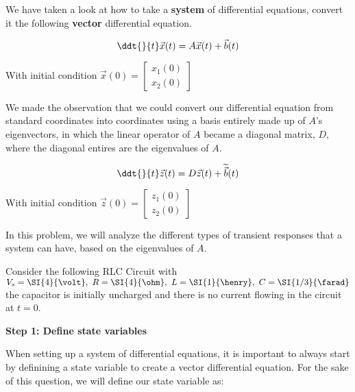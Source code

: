 

We have taken a look at how to take a \textbf{system} of differential equations, convert it the following \textbf{vector} differential equation.

\begin{equation}\label{eq:vec}
\ddt{}{t} \vec{x}(t) = A \vec{x}(t) + \vec{b}(t)
\end{equation}

With initial condition $\vec{x}(0) = \begin{bmatrix} x_1(0) \\ x_2(0) \end{bmatrix}$

We made the observation that we could convert our differential equation from standard coordinates into coordinates using a basis entirely made up of $A$'s eigenvectors, in which the linear operator of $A$ became a diagonal matrix, $D,$ where the diagonal entires are the eigenvalues of $A.$

\begin{equation}\label{eq:diag}
\ddt{}{t} \vec{z}(t) = D \vec{z}(t) + \widetilde{\vec{b}}(t)
\end{equation}

With initial condition $\vec{z}(0) = \begin{bmatrix} z_1(0) \\ z_2(0) \end{bmatrix}$

In this problem, we will analyze the different types of transient responses that a system can have, based on the eigenvalues of $A.$

Consider the following RLC Circuit with $V_{s} = \SI{4}{\volt}, \ R = \SI{4}{\ohm}, \ L = \SI{1}{\henry}, \ C = \SI{1/3}{\farad}$ the capacitor is initially uncharged and there is no current flowing in the circuit at $t = 0.$



\qitem \textbf{Step 1: Define state variables}


When setting up a system of differential equations, it is important to always start by definining a state variable to create a vector differential equation. For the sake of this question, we will define our state variable as:

